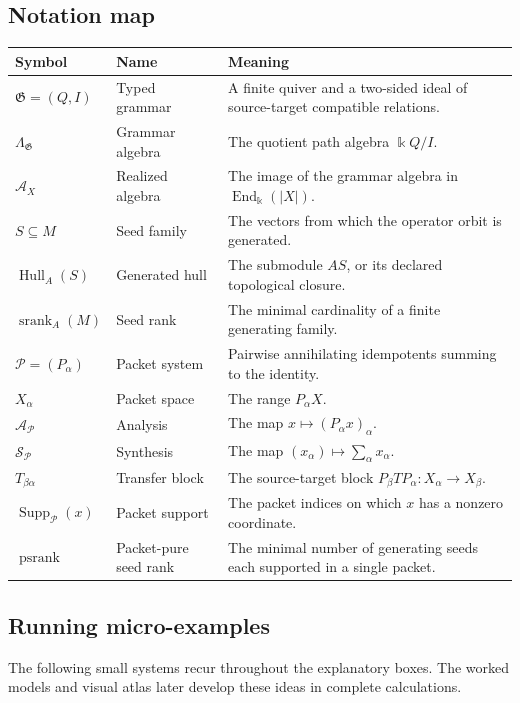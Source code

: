 \documentclass[11pt]{article}
\theoremstyle{definition}
\theoremstyle{remark}
\theoremstyle{definition}\newtheorem{example}[theorem]{Example}
\newcommand{\bbk}{\Bbbk}
\newcommand{\A}{\mathcal A}
\newcommand{\Pcal}{\mathcal P}
\newcommand{\Hull}{\operatorname{Hull}}
\newcommand{\srank}{\operatorname{srank}}
\newcommand{\psrank}{\operatorname{psrank}}
\newcommand{\End}{\operatorname{End}}
\newcommand{\Supp}{\operatorname{Supp}}
\begin{document}
\subsection*{Notation map}
\begin{center}
\begin{longtable}{@{}p{}p{}p{}@{}}
\toprule
\textbf{Symbol} & \textbf{Name} & \textbf{Meaning}\\
\midrule
\endhead
\(\mathfrak G=(Q,I)\) & Typed grammar & A finite quiver and a two-sided ideal of source-target compatible relations.\\
\(\Lambda_{\mathfrak G}\) & Grammar algebra & The quotient path algebra \(\bbk Q/I\).\\
\(\A_X\) & Realized algebra & The image of the grammar algebra in \(\End_{\bbk}(|X|)\).\\
\(S\subseteq M\) & Seed family & The vectors from which the operator orbit is generated.\\
\(\Hull_A(S)\) & Generated hull & The submodule \(AS\), or its declared topological closure.\\
\(\srank_A(M)\) & Seed rank & The minimal cardinality of a finite generating family.\\
\(\Pcal=(P_\alpha)\) & Packet system & Pairwise annihilating idempotents summing to the identity.\\
\(X_\alpha\) & Packet space & The range \(P_\alpha X\).\\
\(\mathcal A_{\Pcal}\) & Analysis & The map \(x\mapsto(P_\alpha x)_\alpha\).\\
\(\mathcal S_{\Pcal}\) & Synthesis & The map \((x_\alpha)\mapsto\sum_\alpha x_\alpha\).\\
\(T_{\beta\alpha}\) & Transfer block & The source-target block \(P_\beta TP_\alpha:X_\alpha\to X_\beta\).\\
\(\Supp_{\Pcal}(x)\) & Packet support & The packet indices on which \(x\) has a nonzero coordinate.\\
\(\psrank\) & Packet-pure seed rank & The minimal number of generating seeds each supported in a single packet.\\
\bottomrule
\end{longtable}
\end{center}

\subsection*{Running micro-examples}
The following small systems recur throughout the explanatory boxes. The worked models and visual atlas later develop these ideas in complete calculations.
\end{document}
